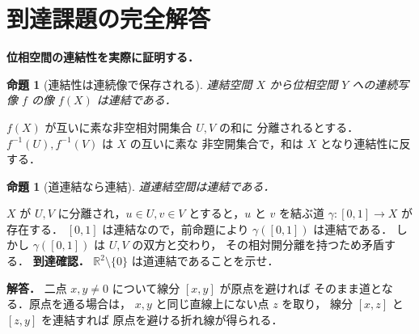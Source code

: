 \documentclass[a5paper,10pt,onecolumn]{jsarticle}
\makeatletter
\theoremstyle{mathnotetheorem}
\newtheorem{proposition}[theorem]{命題}
\renewcommand{\proofname}{証明}
\renewenvironment{proof}[1][\proofname]{%
  \par\pushQED{\qed}\normalfont\topsep4\p@\@plus2\p@\relax
  \trivlist\item[\hskip\labelsep\bfseries #1]\ignorespaces
}{\popQED\endtrivlist\@endpefalse}
\makeatother
\begin{document}
\section{到達課題の完全解答}
\noindent\textbf{位相空間の連結性を実際に証明する．}
\begin{proposition}[連結性は連続像で保存される]
連結空間 $X$ から位相空間 $Y$ への連続写像
$f$ の像 $f(X)$ は連結である．
\end{proposition}
\begin{proof}
$f(X)$ が互いに素な非空相対開集合 $U,V$ の和に
分離されるとする．
$f^{-1}(U),f^{-1}(V)$ は $X$ の互いに素な
非空開集合で，和は $X$ となり連結性に反する．
\end{proof}
\begin{proposition}[道連結なら連結]
道連結空間は連結である．
\end{proposition}
\begin{proof}
$X$ が $U,V$ に分離され，$u\in U,v\in V$
とすると，$u$ と $v$ を結ぶ道
$\gamma:[0,1]\to X$ が存在する．
$[0,1]$ は連結なので，前命題により
$\gamma([0,1])$ は連結である．
しかし $\gamma([0,1])$ は $U,V$ の双方と交わり，
その相対開分離を持つため矛盾する．
\end{proof}
\noindent\textbf{到達確認．}
$\mathbb R^2\setminus\{0\}$ は道連結であることを示せ．
\par\noindent\textbf{解答．}
二点 $x,y\ne0$ について線分 $[x,y]$ が原点を避ければ
そのまま道となる．原点を通る場合は，
$x,y$ と同じ直線上にない点 $z$ を取り，
線分 $[x,z]$ と $[z,y]$ を連結すれば
原点を避ける折れ線が得られる．
\end{document}
